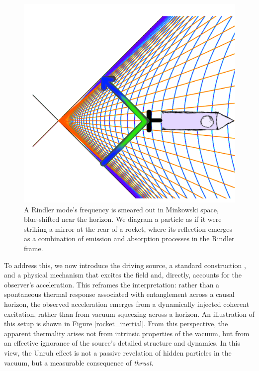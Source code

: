\documentclass[12pt,a4paper]{article}
\begin{document}
\begin{figure}[h]
\centering
\includegraphics[scale=1.5]{emit_absorb.png}
\captionsetup{width=0.7\textwidth}
\caption{
  A Rindler mode's frequency is smeared out in Minkowski space, blue-shifted near the horizon. We diagram a particle as if it were striking a mirror at the rear of a rocket, where its reflection emerges as a combination of emission and absorption processes in the Rindler frame.}
\label{emit_absorb}
\end{figure}

To address this, we now introduce the driving source, a standard construction \cite{Schwinger_1966} \cite{ryder1996quantum}, and a physical mechanism that excites the field and, directly, accounts for the observer's acceleration. This reframes the interpretation: rather than a spontaneous thermal response associated with entanglement across a causal horizon, the observed acceleration emerges from a dynamically injected coherent excitation, rather than from vacuum squeezing across a horizon. An illustration of this setup is shown in Figure \ref{rocket_inertial}. From this perspective, the apparent thermality arises not from intrinsic properties of the vacuum, but from an effective ignorance of the source's detailed structure and dynamics. In this view, the Unruh effect is not a passive revelation of hidden particles in the vacuum, but a measurable consequence of {\it thrust}.
\end{document}
